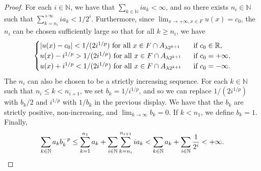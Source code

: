 \documentclass[10pt]{amsart}
\numberwithin{equation}{section}
\newcommand{\N}{\mathbb{N}}
\begin{document}

\begin{proof}
For each $i\in\N$, we have that $\sum_{k\in\N}ia_k<\infty$, and so there exists $n_i\in\N$ such that $\sum_{k=n_i}^{+\infty} ia_k<1/2^i$.  Furthermore, since $\lim_{x\to+\infty,x\in F}u(x)=c_0$, the $n_i$ can be chosen sufficiently large so that for all $k\ge n_i$, we have 
\[
		\begin{cases}
		\text{\rm  $|u(x)-c_0|<1/(2i^{1/p})$ for all $x\in  F\cap A_{\lambda 2^{k+1}}$} & \text{\rm \ \ if $c_0\in\mathbb R$},\\
		\text{\rm $u(x)-i^{1/p}>1/(2i^{1/p})$ for all $x\in  F\cap A_{\lambda 2^{k+1}}$} & \text{\rm \ \ if $c_0=+\infty$},\\ 
		\text{\rm $u(x)+i^{1/p}<1/(2i^{1/p})$ for all $x\in  F\cap A_{\lambda 2^{k+1}}$} & \text{\rm \ \ if $c_0=-\infty$}.
		\end{cases}
	\]
The $n_i$ can also be chosen to be a strictly increasing sequence.  For each $k\in\N$ such that $n_i\le k<n_{i+1}$, we set $b_k=1/i^{1/p}$, and so we can replace $1/(2i^{1/p})$ with $b_k/2$ and $i^{1/p}$ with $1/b_k$ in the previous display.  We have that the $b_k$ are strictly positive, non-increasing, and $\lim_{k\to\infty}b_k=0$. If $k<n_1$, we define $b_k=1$.  Finally,
\[
\sum_{k\in\N}a_kb_k^{-p}
\leq \sum_{k=1}^{n_1}a_k+\sum_{i\in\N}\sum_{k=n_i}^{n_{i+1}}ia_k<\sum_{k\in\mathbb N}a_k+\sum_{i\in\N}\frac{1}{2^i}<+\infty.\qedhere
\]
\end{proof}
\end{document}
